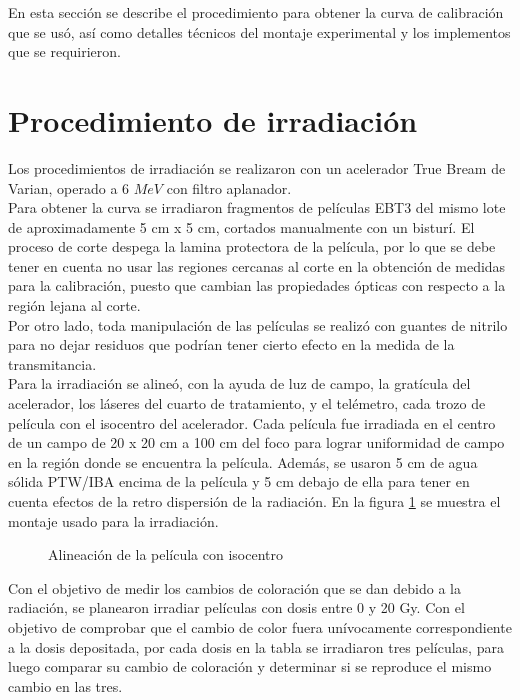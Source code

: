 En esta sección se describe el procedimiento para obtener la curva de calibración que se usó, así como detalles técnicos del montaje experimental y los implementos que se requirieron. 
\section{Procedimiento de irradiación}
Los procedimientos de irradiación se realizaron con un acelerador True Bream de  Varian, operado a 6 $ MeV$ con filtro aplanador.\\

Para obtener la curva se irradiaron fragmentos de películas EBT3 del mismo lote de aproximadamente 5 cm x 5 cm, cortados manualmente con un bisturí. El proceso de corte despega la lamina protectora de la película, por lo que se debe tener en cuenta no usar las regiones cercanas al corte en la obtención de medidas para la calibración, puesto que cambian las propiedades ópticas con respecto a la región lejana al corte. \\

Por otro lado, toda manipulación de las películas se realizó con guantes de nitrilo para no dejar residuos que podrían tener cierto efecto en la medida de la transmitancia. \\

Para la irradiación se alineó, con la ayuda de luz de campo, la gratícula del acelerador, los láseres del cuarto de tratamiento, y el telémetro, cada trozo de película con el isocentro del acelerador. Cada película fue irradiada en el centro de un campo de 20 x 20 cm a 100 cm del foco para lograr uniformidad de campo en la región donde se encuentra la película. Además, se usaron 5 cm de agua sólida PTW/IBA encima de la película y 5 cm debajo de ella para tener en cuenta efectos de la retro dispersión de la radiación. En la figura  \ref{fig:MontajePelicula} se muestra el montaje usado para la irradiación.\\
\begin{figure}
	\centering
	
	\caption{Alineación de la película con isocentro}
	\label{fig:MontajePelicula}
\end{figure}

Con el objetivo de medir los cambios de coloración que se dan debido a la radiación, se planearon irradiar películas con dosis entre 0 y 20 Gy. Con el objetivo de comprobar que el cambio de color fuera unívocamente correspondiente a la dosis depositada, por cada dosis en la tabla se irradiaron tres películas, para luego comparar su cambio de coloración y determinar si se reproduce el mismo cambio en las tres.\\ 


